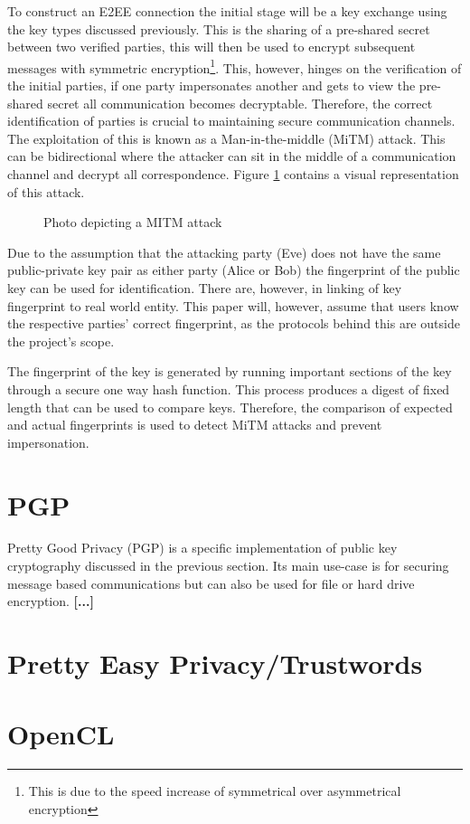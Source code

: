To construct an E2EE connection the initial stage will be a key exchange using the key types discussed previously. This is the sharing of a pre-shared secret between two verified parties, this will then be used to encrypt subsequent messages with symmetric encryption\footnote{This is due to the speed increase of symmetrical over asymmetrical encryption}. This, however, hinges on the verification of the initial parties, if one party impersonates another and gets to view the pre-shared secret all communication becomes decryptable. Therefore, the correct identification of parties is crucial to maintaining secure communication channels. The exploitation of this is known as a Man-in-the-middle (MiTM) attack. This can be bidirectional where the attacker can sit in the middle of a communication channel and decrypt all correspondence. Figure \ref{fig:mitm} contains a visual representation of this attack.

\begin{center}
    
    \begin{figure}[h]
        \caption{Photo depicting a MITM attack}
        \label{fig:mitm}
    \end{figure}
\end{center}

Due to the assumption that the attacking party (Eve) does not have the same public-private key pair as either party (Alice or Bob) the fingerprint of the public key can be used for identification. There are, however, in linking of key fingerprint to real world entity. This paper will, however, assume that users know the respective parties' correct fingerprint, as the protocols behind this are outside the project's scope. 

The fingerprint of the key is generated by running important sections of the key through a secure one way hash function. This process produces a digest of fixed length that can be used to compare keys. Therefore, the comparison of expected and actual fingerprints is used to detect MiTM attacks and prevent impersonation.

\section{PGP}
Pretty Good Privacy (PGP) is a specific implementation of public key cryptography discussed in the previous section. Its main use-case is for securing message based communications but can also be used for file or hard drive encryption.
\textbf{[...]}

\section{Pretty Easy Privacy/Trustwords}

\section{OpenCL}